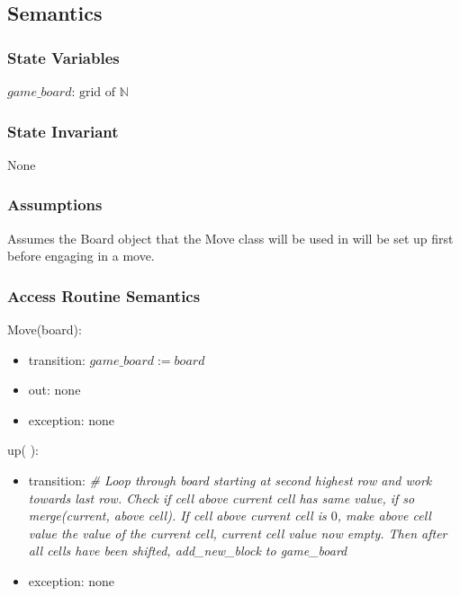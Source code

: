 \documentclass[12pt]{article}
\begin{document}
\begin{itemize}
\begin{tabular}{| l | l | l | p{5cm} |}
\end{tabular}

\subsection* {Semantics}

\subsubsection* {State Variables}

$\mathit{game\_board}$: $\text{grid of } \mathbb{N}$

\subsubsection* {State Invariant}

None

\subsubsection* {Assumptions}

Assumes the Board object that the Move class will be used in will be set up first before engaging in a move.  

\subsubsection* {Access Routine Semantics}

\noindent Move(board):
\begin{itemize}
\item transition: $\mathit{game\_board} := \mathit{board}$
\item out: none
\item exception: none
\end{itemize}

\noindent up( ):
\begin{itemize}
\item transition: \textit{\# Loop through board starting at second highest row and work towards last row. Check if cell above current cell has same value, if so merge(current, above cell). If cell above current cell is $0$, make above cell value the value of the current cell, current cell value now empty. Then after all cells have been shifted, add\_new\_block to game\_board} ~\\
\item exception: none
\end{itemize}


\end{itemize}
\end{document}
